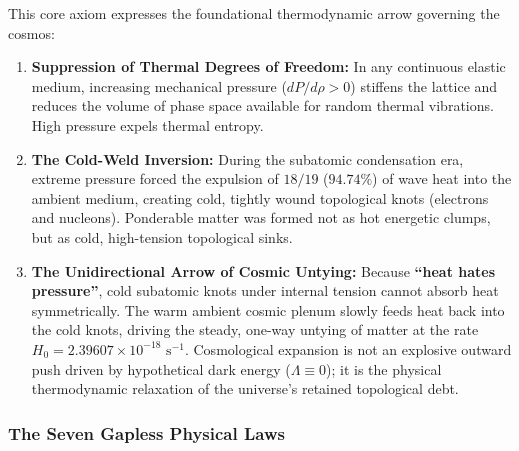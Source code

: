 \documentclass[11pt,a4paper]{article}
\begin{document}
This core axiom expresses the foundational thermodynamic arrow governing the cosmos:
\begin{enumerate}
    \item \textbf{Suppression of Thermal Degrees of Freedom:} In any continuous elastic medium, increasing mechanical pressure ($dP/d\rho > 0$) stiffens the lattice and reduces the volume of phase space available for random thermal vibrations. High pressure expels thermal entropy.
    \item \textbf{The Cold-Weld Inversion:} During the subatomic condensation era, extreme pressure forced the expulsion of $18/19$ ($94.74\%$) of wave heat into the ambient medium, creating cold, tightly wound topological knots (electrons and nucleons). Ponderable matter was formed not as hot energetic clumps, but as cold, high-tension topological sinks.
    \item \textbf{The Unidirectional Arrow of Cosmic Untying:} Because \textbf{``heat hates pressure''}, cold subatomic knots under internal tension cannot absorb heat symmetrically. The warm ambient cosmic plenum slowly feeds heat back into the cold knots, driving the steady, one-way untying of matter at the rate $H_0 = 2.39607 \times 10^{-18}\text{ s}^{-1}$. Cosmological expansion is not an explosive outward push driven by hypothetical dark energy ($\Lambda \equiv 0$); it is the physical thermodynamic relaxation of the universe's retained topological debt.
\end{enumerate}

\subsubsection{The Seven Gapless Physical Laws}
\label{subsubsec:seven_gapless_laws}
\end{document}

